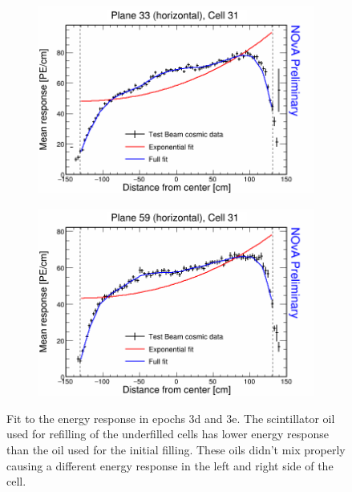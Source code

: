 \begin{figure}[h]
  \begin{subfigure}{0.495\textwidth}
    \includegraphics[width=\linewidth]{Plots/RelativeCalibrationResults/ep3de_033_031.png}
  \end{subfigure}
  \begin{subfigure}{0.495\textwidth}
    \includegraphics[width=\linewidth]{Plots/RelativeCalibrationResults/ep3de_059_031.png}
  \end{subfigure}
  \caption[Attenuation fits for cells with mixed scintillators in period 3 data]{Fit to the energy response in epochs 3d and 3e. The scintillator oil used for refilling of the underfilled cells has lower energy response than the oil used for the initial filling. These oils didn't mix properly causing a different energy response in the left and right side of the cell.}
  \label{fig:AttenfitResultsEpoch3de_RefilledDiscrepancy}
\end{figure}
